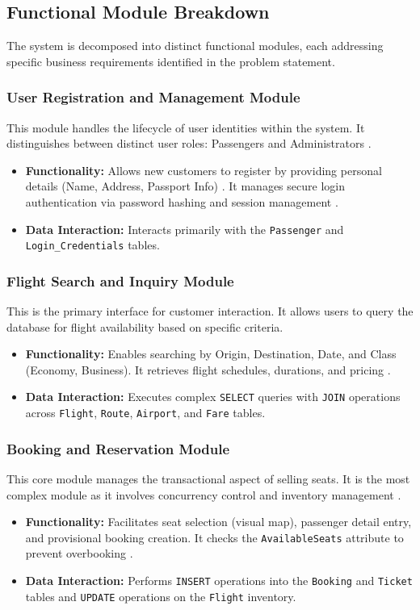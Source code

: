 \documentclass[12pt, a4paper]{article}
\begin{document}
	\subsection{Functional Module Breakdown}
	The system is decomposed into distinct functional modules, each addressing specific business requirements identified in the problem statement.
	
	\subsubsection{User Registration and Management Module}
	This module handles the lifecycle of user identities within the system. It distinguishes between distinct user roles: Passengers and Administrators \cite{ref26}.
	\begin{itemize}
		\item \textbf{Functionality:} Allows new customers to register by providing personal details (Name, Address, Passport Info) \cite{ref2}. It manages secure login authentication via password hashing and session management \cite{ref26}.
		\item \textbf{Data Interaction:} Interacts primarily with the \texttt{Passenger} and \texttt{Login\_Credentials} tables.
	\end{itemize}
	
	\subsubsection{Flight Search and Inquiry Module}
	This is the primary interface for customer interaction. It allows users to query the database for flight availability based on specific criteria.
	\begin{itemize}
		\item \textbf{Functionality:} Enables searching by Origin, Destination, Date, and Class (Economy, Business). It retrieves flight schedules, durations, and pricing \cite{ref9, ref26}.
		\item \textbf{Data Interaction:} Executes complex \texttt{SELECT} queries with \texttt{JOIN} operations across \texttt{Flight}, \texttt{Route}, \texttt{Airport}, and \texttt{Fare} tables.
	\end{itemize}
	
	\subsubsection{Booking and Reservation Module}
	This core module manages the transactional aspect of selling seats. It is the most complex module as it involves concurrency control and inventory management \cite{ref2}.
	\begin{itemize}
		\item \textbf{Functionality:} Facilitates seat selection (visual map), passenger detail entry, and provisional booking creation. It checks the \texttt{AvailableSeats} attribute to prevent overbooking \cite{ref27}.
		\item \textbf{Data Interaction:} Performs \texttt{INSERT} operations into the \texttt{Booking} and \texttt{Ticket} tables and \texttt{UPDATE} operations on the \texttt{Flight} inventory.
	\end{itemize}
	
\end{document}
